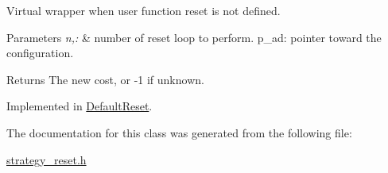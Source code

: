 \-Virtual wrapper when user function reset is not defined. 


\begin{DoxyParams}{\-Parameters}
{\em n,\-:} & number of reset loop to perform. p\-\_\-ad\-: pointer toward the configuration. \\
\hline
\end{DoxyParams}
\begin{DoxyReturn}{\-Returns}
\-The new cost, or -\/1 if unknown. 
\end{DoxyReturn}


\-Implemented in \hyperlink{classDefaultReset_a82e58336172b51b8a8ce0369cbfd0a55}{\-Default\-Reset}.



\-The documentation for this class was generated from the following file\-:\begin{DoxyCompactItemize}
\item 
\hyperlink{strategy__reset_8h}{strategy\-\_\-reset.\-h}\end{DoxyCompactItemize}
